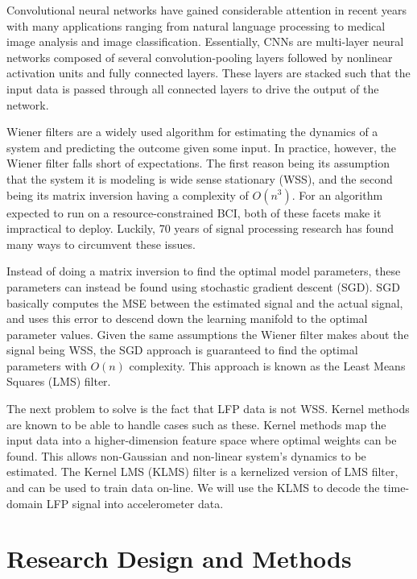 \documentclass[12pt]{article}
\begin{document}
Convolutional neural networks have gained considerable attention in recent years with many applications ranging from natural language processing to medical image analysis and image classification. Essentially, CNNs are multi-layer neural networks composed of several convolution-pooling layers followed by nonlinear activation units and fully connected layers.
These layers are stacked such that the input data is passed through all connected layers to drive the output of the network. 
 \cite{krizhevsky2017}

Wiener filters are a widely used algorithm for estimating the dynamics of a system and predicting the outcome given some input. In practice, however, the Wiener filter falls short of expectations. The first reason being its assumption that the system it is modeling is wide sense stationary (WSS), and the second being its matrix inversion having a complexity of $O(n^3)$. For an algorithm expected to run on a resource-constrained BCI, both of these facets make it impractical to deploy. Luckily, 70 years of signal processing research has found many ways to circumvent these issues. \cite{li2012}

Instead of doing a matrix inversion to find the optimal model parameters, these parameters can instead be found using stochastic gradient descent (SGD). SGD basically computes the MSE between the estimated signal and the actual signal, and uses this error to descend down the learning manifold to the optimal parameter values. Given the same assumptions the Wiener filter makes about the signal being WSS, the SGD approach is guaranteed to find the optimal parameters with $O(n)$ complexity. This approach is known as the Least Means Squares (LMS) filter. \cite{li2012}

The next problem to solve is the fact that LFP data is not WSS. Kernel methods are known to be able to handle cases such as these. Kernel methods map the input data into a higher-dimension feature space where optimal weights can be found. This allows non-Gaussian and non-linear system’s dynamics to be estimated. The Kernel LMS (KLMS) filter is a kernelized version of LMS filter, and can be used to train data on-line. We will use the KLMS to decode the time-domain LFP signal into accelerometer data. \cite{li2012}



\section{Research Design and Methods}
\end{document}
